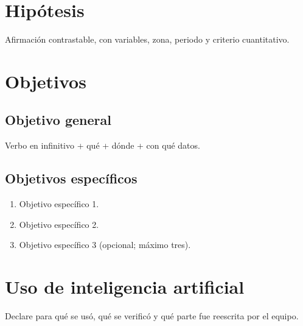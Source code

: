 \documentclass[12pt,a4paper]{article}
\begin{document}
\section{Hip\'otesis}
Afirmaci\'on contrastable, con variables, zona, periodo y criterio cuantitativo.

\section{Objetivos}
\subsection{Objetivo general}
Verbo en infinitivo + qu\'e + d\'onde + con qu\'e datos.

\subsection{Objetivos espec\'ificos}
\begin{enumerate}
  \item Objetivo espec\'ifico 1.
  \item Objetivo espec\'ifico 2.
  \item Objetivo espec\'ifico 3 (opcional; m\'aximo tres).
\end{enumerate}
\printbibliography[title={Referencias}]

\appendix
\section{Uso de inteligencia artificial}
Declare para qu\'e se us\'o, qu\'e se verific\'o y qu\'e parte fue reescrita por el equipo.
\end{document}
